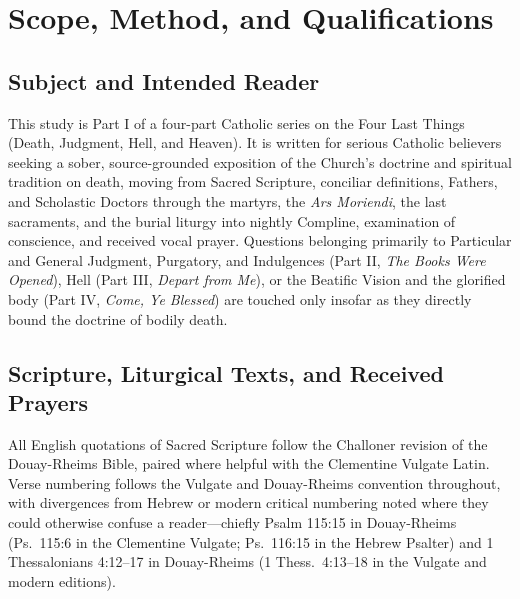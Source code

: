 \section{Scope, Method, and Qualifications}

\subsection*{Subject and Intended Reader}

This study is Part I of a four-part Catholic series on the Four Last Things (Death, Judgment, Hell, and Heaven). It is written for serious Catholic believers seeking a sober, source-grounded exposition of the Church's doctrine and spiritual tradition on death, moving from Sacred Scripture, conciliar definitions, Fathers, and Scholastic Doctors through the martyrs, the \textit{Ars Moriendi}, the last sacraments, and the burial liturgy into nightly Compline, examination of conscience, and received vocal prayer. Questions belonging primarily to Particular and General Judgment, Purgatory, and Indulgences (Part II, \textit{The Books Were Opened}), Hell (Part III, \textit{Depart from Me}), or the Beatific Vision and the glorified body (Part IV, \textit{Come, Ye Blessed}) are touched only insofar as they directly bound the doctrine of bodily death.

\subsection*{Scripture, Liturgical Texts, and Received Prayers}

All English quotations of Sacred Scripture follow the Challoner revision of the Douay-Rheims Bible, paired where helpful with the Clementine Vulgate Latin. Verse numbering follows the Vulgate and Douay-Rheims convention throughout, with divergences from Hebrew or modern critical numbering noted where they could otherwise confuse a reader---chiefly Psalm 115:15 in Douay-Rheims (Ps.\ 115:6 in the Clementine Vulgate; Ps.\ 116:15 in the Hebrew Psalter) and 1 Thessalonians 4:12--17 in Douay-Rheims (1 Thess.\ 4:13--18 in the Vulgate and modern editions).

